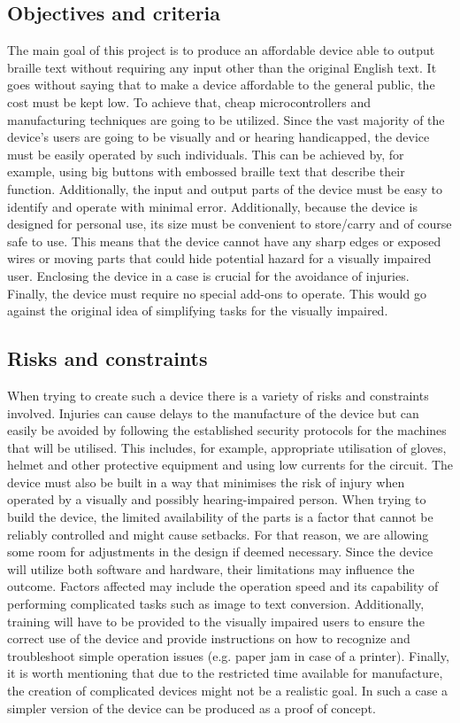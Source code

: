 \subsection{Objectives and criteria}
The main goal of this project is to produce an affordable device able to output braille text without requiring any input other than the original English text.
It goes without saying that to make a device affordable to the general public, the cost must be kept low.
To achieve that, cheap microcontrollers and manufacturing techniques are going to be utilized.
Since the vast majority of the device's users are going to be visually and or hearing handicapped, the device must be easily operated by such individuals.
This can be achieved by, for example, using big buttons with embossed braille text that describe their function.
Additionally, the input and output parts of the device must be easy to identify and operate with minimal error.
Additionally, because the device is designed for personal use, its size must be convenient to store/carry and of course safe to use.
This means that the device cannot have any sharp edges or exposed wires or moving parts that could hide potential hazard for a visually impaired user.
Enclosing the device in a case is crucial for the avoidance of injuries.
Finally, the device must require no special add-ons to operate.
This would go against the original idea of simplifying tasks for the visually impaired.
 

\subsection{Risks and constraints}
When trying to create such a device there is a variety of risks and constraints involved.
 Injuries can cause delays to the manufacture of the device but can easily be avoided by following the established security protocols for the machines that will be utilised.
This includes, for example, appropriate utilisation of gloves, helmet and other protective equipment and using low currents for the circuit.
The device must also be built in a way that minimises the risk of injury when operated by a visually and possibly hearing-impaired person.
When trying to build the device, the limited availability of the parts is a factor that cannot be reliably controlled and might cause setbacks.
For that reason, we are allowing some room for adjustments in the design if deemed necessary.
Since the device will utilize both software and hardware, their limitations may influence the outcome.
Factors affected may include the operation speed and its capability of performing complicated tasks such as image to text conversion.
Additionally, training will have to be provided to the visually impaired users to ensure the correct use of the device and provide instructions on how to recognize and troubleshoot simple operation issues (e.g.
paper jam in case of a printer).
Finally, it is worth mentioning that due to the restricted time available for manufacture, the creation of complicated devices might not be a realistic goal.
In such a case a simpler version of the device can be produced as a proof of concept.